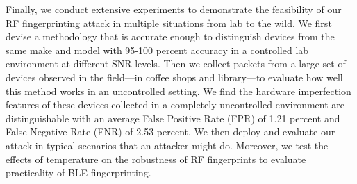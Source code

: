 %



Finally, we conduct extensive experiments to demonstrate the feasibility of our 
RF fingerprinting attack in multiple situations from lab to the wild. We first devise a methodology 
that is accurate enough to distinguish devices from the same make and model with 95-100 percent accuracy in a 
controlled lab environment at different SNR levels. Then we collect packets from a large set of 
devices observed in the field---in coffee shops and library---to evaluate
 how well this method works in an uncontrolled setting.%
 We find the hardware 
 imperfection features of these devices collected in a completely uncontrolled environment
 are distinguishable with an average False Positive Rate (FPR) of 1.21 percent and False Negative 
 Rate (FNR) of 2.53 percent. We then deploy and evaluate our attack in typical scenarios that an attacker might do. Moreover, we test the effects of temperature on the robustness of RF fingerprints to evaluate practicality of BLE fingerprinting.

